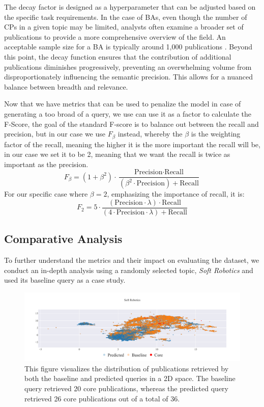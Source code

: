 The decay factor is designed as a hyperparameter that can be adjusted based on the specific task requirements. In the case of BAs, even though the number of CPs in a given topic may be limited, analysts often examine a broader set of publications to provide a more comprehensive overview of the field. An acceptable sample size for a BA is typically around 1,000 publications \autocite{Rogers2020}. Beyond this point, the decay function ensures that the contribution of additional publications diminishes progressively, preventing an overwhelming volume from disproportionately influencing the semantic precision. This allows for a nuanced balance between breadth and relevance.

Now that we have metrics that can be used to penalize the model in case of generating a too broad of a query, we use can use it as a factor to calculate the F-Score, the goal of the standard F-score is to balance out between the recall and precision, but in our case we use $F_\beta$ instead, whereby the $\beta$ is the weighting factor of the recall, meaning the higher it is the more important the recall will be, in our case we set it to be 2, meaning that we want the recall is twice as important as the precision.
\begin{equation}\label{eq:f-beta}
F_\beta = (1 + \beta^2) \cdot \frac{\text{Precision} \cdot \text{Recall}}{(\beta^2 \cdot \text{Precision}) + \text{Recall}}
\end{equation}
For our specific case where $\beta = 2$, emphasizing the importance of recall, it is:
\[
	F_2 = 5 \cdot \frac{(\text{Precision} \cdot \lambda) \cdot \text{Recall}}{(4 \cdot \text{Precision}\cdot \lambda) + \text{Recall}}
\]

\subsection*{Comparative Analysis}
To further understand the metrics and their impact on evaluating the dataset, we conduct an in-depth analysis using a randomly selected topic, \textit{Soft Robotics} and used its baseline query as a case study.

\begin{figure}[!hb]
	\hspace*{-1cm}	
	\includegraphics[scale=0.45]{pics/sr-landscape.pdf}
	\caption[Embedding of Soft Robotics]{This figure visualizes the distribution of publications retrieved by both the baseline and predicted queries in a 2D space. The baseline query retrieved 20 core publications, whereas the predicted query retrieved 26 core publications out of a total of 36.}\label{fig:sr-landscape}
\end{figure}

